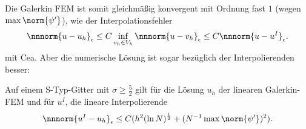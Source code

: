 Die Galerkin FEM ist somit gleichmäßig konvergent mit Ordnung fast $1$ (wegen $\max \norm {\psi'}$), wie der Interpolationsfehler
\begin{align*}
  \nnnorm {u - u_{h}}_{\epsilon} \leq C \inf_{v_{h} \in V_{h}} \nnnorm{u - v_{h}}_{\epsilon} \leq C \nnnorm{u - u^{I}}_{\epsilon}. 
\end{align*}
mit Cea. Aber die numerische Lösung ist sogar bezüglich der Interpolierenden besser: 
\begin{satz}\label{thm:6-16}
  Auf einem S-Typ-Gitter mit $\sigma \geq \frac 52$ gilt für die Lösung $u_{h}$ der linearen Galerkin-FEM und für $u^{I}$, die lineare Interpolierende
  \begin{align*}
    \nnnorm{u^{I} - u_{h}}_{\epsilon} \leq C (h^{2} (\ln N)^{\frac 12} + (N^{-1} \max \norm{\psi'}) ^{2}). 
  \end{align*}
 \end{satz}
